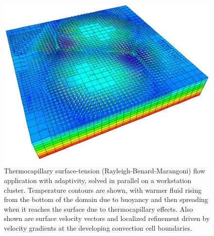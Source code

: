\documentclass[global,twocolumn,final]{svjour}
\begin{document}
\begin{figure}[hbt]
  \begin{center}
    \includegraphics[width=\columnwidth]{figures/rbm_adapt_soln}    
    \caption{Thermocapillary surface-tension
      (Rayleigh-B$\acute{\text{e}}$nard-Marangoni) flow application with
      adaptivity, solved in parallel on a workstation cluster.
      Temperature contours are shown, with warmer
      fluid rising from the bottom of the domain due to buoyancy and
      then spreading when it reaches the surface due to
      thermocapillary effects.  Also shown are surface velocity
      vectors and localized refinement driven by velocity gradients at
      the developing convection cell boundaries.
      \label{fig:rbm}}
  \end{center}
\end{figure}
\end{document}
